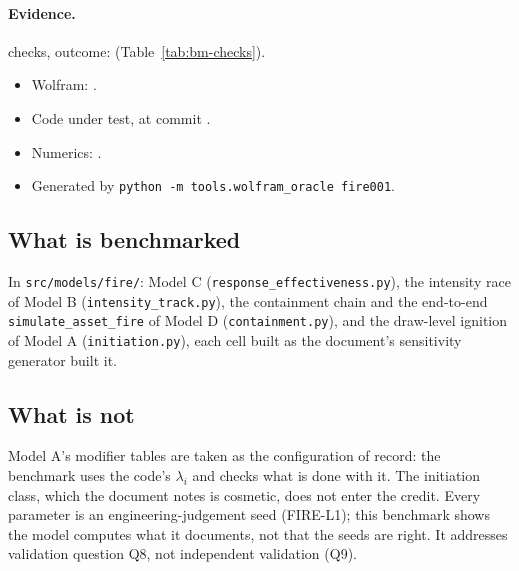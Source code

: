 \documentclass[11pt,a4paper]{article}
\begin{document}
\paragraph{Evidence.} \bmChecks{} checks, outcome: \bmOutcome{}
(Table~\ref{tab:bm-checks}).
\begin{itemize}[leftmargin=*,nosep]
\item Wolfram: \bmWolfram{}\bmWolframVia.
\item Code under test, at commit \bmCodeCommit{}\bmCodeDirty.
\item Numerics: \bmNumerics.
\item Generated \bmGenerated{} by \texttt{python -m tools.wolfram\_oracle fire001}.
\end{itemize}

\mkmpurpose

\subsection{What is benchmarked}
In \texttt{src/models/fire/}: Model C (\texttt{response\_effectiveness.py}), the
intensity race of Model B (\texttt{intensity\_track.py}), the containment chain and
the end-to-end \texttt{simulate\_asset\_fire} of Model D (\texttt{containment.py}),
and the draw-level ignition of Model A (\texttt{initiation.py}), each cell built as
the document's sensitivity generator built it.

\subsection{What is not}
Model A's modifier tables are taken as the configuration of record: the benchmark
uses the code's $\lambda_i$ and checks what is done with it. The initiation class,
which the document notes is cosmetic, does not enter the credit. Every parameter is
an engineering-judgement seed (FIRE-L1); this benchmark shows the model computes
what it documents, not that the seeds are right. It addresses validation question
Q8, not independent validation (Q9).

\mkmframework
\end{document}
